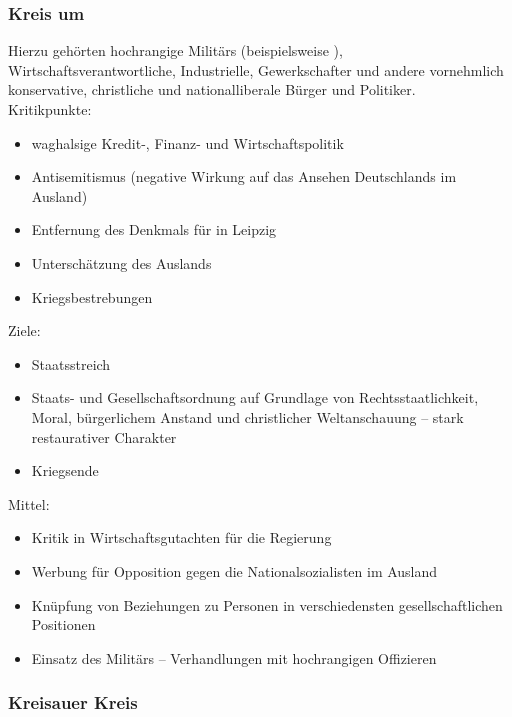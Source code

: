 \subsubsection{Kreis um }

Hierzu gehörten hochrangige Militärs (beispielsweise ), Wirtschaftsverantwortliche,
Industrielle, Gewerkschafter und andere vornehmlich konservative,
christliche und nationalliberale Bürger und Politiker. \\

\noindent Kritikpunkte:

\begin{itemize}
\item waghalsige Kredit-, Finanz- und Wirtschaftspolitik
\item Antisemitismus (negative Wirkung auf das Ansehen Deutschlands im
Ausland)
\item Entfernung des Denkmals für  in Leipzig
\item Unterschätzung des Auslands
\item Kriegsbestrebungen
\end{itemize}

\noindent Ziele:

\begin{itemize}
\item Staatsstreich
\item Staats- und Gesellschaftsordnung auf Grundlage von
Rechtsstaatlichkeit, Moral, bürgerlichem Anstand und christlicher
Weltanschauung -- stark restaurativer Charakter
\item Kriegsende
\end{itemize}

\noindent Mittel:

\begin{itemize}
\item Kritik in Wirtschaftsgutachten für die Regierung
\item Werbung für Opposition gegen die Nationalsozialisten im Ausland
\item Knüpfung von Beziehungen zu Personen in verschiedensten
gesellschaftlichen Positionen
\item Einsatz des Militärs -- Verhandlungen mit hochrangigen
Offizieren
\end{itemize}


\subsubsection{Kreisauer Kreis}

